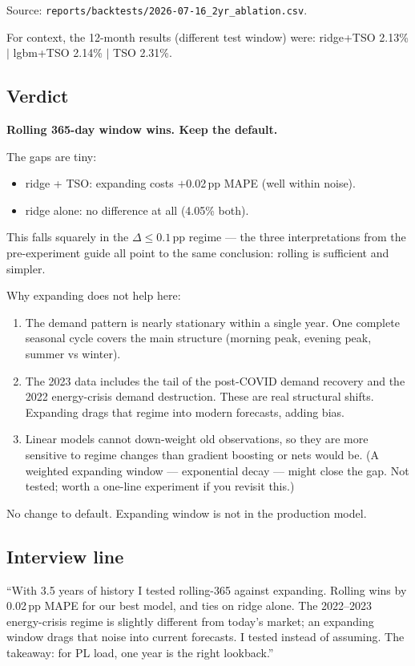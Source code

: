 Source: \texttt{reports/backtests/2026-07-16\_2yr\_ablation.csv}.

For context, the 12-month results (different test window) were:
ridge+TSO 2.13\% $|$ lgbm+TSO 2.14\% $|$ TSO 2.31\%.

\subsection{Verdict}

\textbf{Rolling 365-day window wins. Keep the default.}

The gaps are tiny:
\begin{itemize}
  \item ridge + TSO: expanding costs $+$0.02\,pp MAPE (well within noise).
  \item ridge alone: no difference at all (4.05\% both).
\end{itemize}

This falls squarely in the $\Delta \leq 0.1$\,pp regime --- the three
interpretations from the pre-experiment guide all point to the same conclusion:
rolling is sufficient and simpler.

Why expanding does not help here:
\begin{enumerate}
  \item The demand pattern is nearly stationary within a single year. One
        complete seasonal cycle covers the main structure (morning peak,
        evening peak, summer vs winter).
  \item The 2023 data includes the tail of the post-COVID demand recovery and
        the 2022 energy-crisis demand destruction. These are real structural
        shifts. Expanding drags that regime into modern forecasts, adding bias.
  \item Linear models cannot down-weight old observations, so they are more
        sensitive to regime changes than gradient boosting or nets would be.
        (A weighted expanding window --- exponential decay --- might close the
        gap. Not tested; worth a one-line experiment if you revisit this.)
\end{enumerate}

No change to default. Expanding window is not in the production model.

\subsection{Interview line}

``With 3.5 years of history I tested rolling-365 against expanding.
Rolling wins by 0.02\,pp MAPE for our best model, and ties on ridge alone.
The 2022--2023 energy-crisis regime is slightly different from today's market;
an expanding window drags that noise into current forecasts. I tested instead
of assuming. The takeaway: for PL load, one year is the right lookback.''
